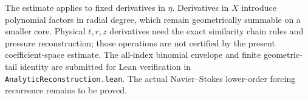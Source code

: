 \noindent The estimate applies to fixed derivatives in $\eta$.
Derivatives in $X$ introduce polynomial factors in radial degree,
which remain geometrically summable on a smaller core.
Physical $t,r,z$ derivatives need the exact similarity chain rules
and pressure reconstruction; those operations are not certified by
the present coefficient-space estimate. The all-index binomial
envelope and finite geometric-tail identity are submitted for Lean
verification in \texttt{AnalyticReconstruction.lean}. The actual
Navier--Stokes lower-order forcing recurrence remains to be proved.
